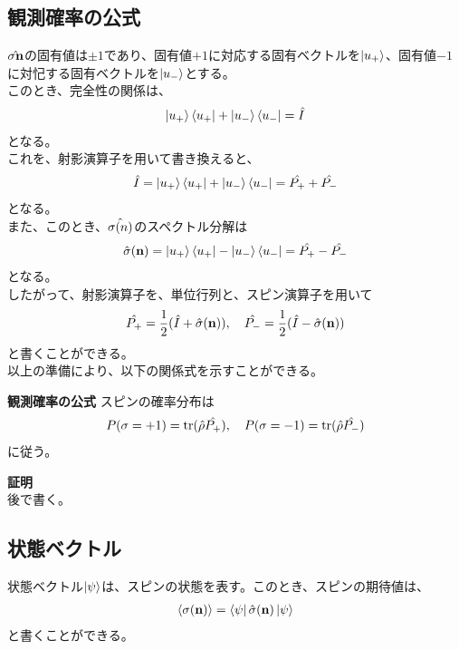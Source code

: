 \documentclass[a4paper,11pt]{jsarticle}
\begin{document}
\subsection{観測確率の公式}
$\hat{\sigma{\vb n}}$の固有値は$\pm 1$であり、固有値$+1$に対応する固有ベクトルを$\ket{u_+}$、固有値$-1$に対忋する固有ベクトルを$\ket{u_-}$とする。\\
このとき、完全性の関係は、
\begin{align}
    \ket{u_+}\bra{u_+} + \ket{u_-}\bra{u_-} = \hat I
\end{align}
となる。\\
これを、射影演算子を用いて書き換えると、
\begin{align}
    \hat I = \ket{u_+}\bra{u_+} + \ket{u_-}\bra{u_-}=\hat{P_+}+\hat{P_-}
\end{align}
となる。\\
また、このとき、$\hat{\sigma{\vb (n)}}$のスペクトル分解は
\begin{align}
    \hat{\sigma}(\vb n) = \ket{u_+}\bra{u_+} - \ket{u_-}\bra{u_-}=\hat{P_+}-\hat{P_-}
\end{align}
となる。\\
したがって、射影演算子を、単位行列と、スピン演算子を用いて
\begin{align}
    \hat{P_+} = \frac{1}{2}(\hat I + \hat{\sigma}(\vb n)), \quad \hat{P_-} = \frac{1}{2}(\hat I - \hat{\sigma}(\vb n))
\end{align}
と書くことができる。\\
以上の準備により、以下の関係式を示すことができる。
\begin{itembox}[l]{\textbf{観測確率の公式}}
    スピンの確率分布は
    \begin{align}
        P(\sigma = +1) = \trace(\hat{\rho}\hat{P_+}), \quad P(\sigma = -1) = \trace(\hat{\rho}\hat{P_-})
    \end{align}
    に従う。
\end{itembox}
\textbf{証明}\\
後で書く。\\

\subsection{状態ベクトル}
状態ベクトル$\ket{\psi}$は、スピンの状態を表す。このとき、スピンの期待値は、
\begin{align}
    \ev{\sigma(\vb n)} = \bra{\psi}\hat{\sigma}(\vb n)\ket{\psi}
\end{align}
と書くことができる。\\
\end{document}
